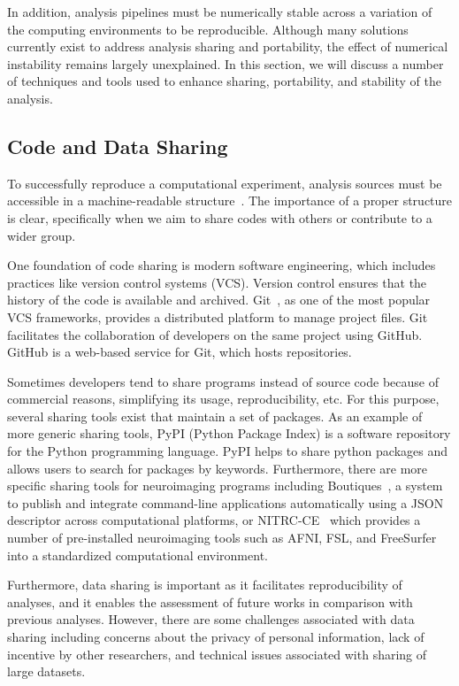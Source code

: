 In addition, analysis pipelines must be numerically stable across a 
variation of the computing environments to be reproducible. Although 
many solutions currently exist to address analysis sharing and 
portability, the effect of numerical instability remains largely 
unexplained. In this section, we will discuss a number of techniques 
and tools used to enhance sharing, portability, and stability of the 
analysis.


\subsection{Code and Data Sharing}

To successfully reproduce a computational experiment, analysis sources 
must be accessible in a machine-readable 
structure~\cite{stodden2016enhancing,hasham2018cloud}. The importance 
of a proper structure is clear, specifically when we aim to share 
codes with others or contribute to a wider group.

One foundation of code sharing is modern software engineering, which 
includes practices like version control systems (VCS). Version control 
ensures that the history of the code is available and archived. 
Git~\cite{git}, as one of the most popular VCS frameworks, provides a 
distributed platform to manage project files. Git facilitates the 
collaboration of developers on the same project using GitHub. GitHub is 
a web-based service for Git, which hosts repositories. 

Sometimes developers tend to share programs instead of source code 
because of commercial reasons, simplifying its usage, reproducibility, 
etc. For this purpose, several sharing tools exist that maintain a set 
of packages. As an example of more generic sharing tools, PyPI (Python 
Package Index) is a software repository for the Python programming 
language. PyPI helps to share python packages and allows users to 
search for packages by keywords. Furthermore, there are more specific 
sharing tools for neuroimaging programs including 
Boutiques~\cite{glatard2017boutiques}, a system to publish and 
integrate command-line applications automatically using a JSON 
descriptor across computational platforms, or 
NITRC-CE~\cite{kennedy2016nitrc} which provides a number of 
pre-installed neuroimaging tools such as AFNI, FSL, and FreeSurfer into 
a standardized computational environment. 

Furthermore, data sharing is important as it facilitates reproducibility 
of analyses, and it enables the assessment of future works in 
comparison with previous analyses. However, there are some challenges 
associated with data sharing including concerns about the privacy of 
personal information, lack of incentive by other researchers, and 
technical issues associated with sharing of large datasets. 

